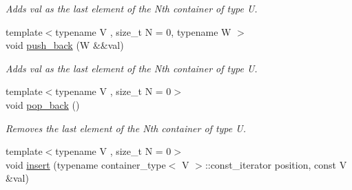 \begin{DoxyCompactItemize}
\begin{DoxyCompactList}\small\item\em Adds val as the last element of the Nth container of type U. \end{DoxyCompactList}\item 
\hypertarget{classheterogeneous_1_1heterovector_3_01_t_00_01_u_00_01_types_8_8_8_4_a72d88bf82827d76a5abdf41ce1f39446}{}{\footnotesize template$<$typename V , size\+\_\+t N = 0, typename W $>$ }\\void \hyperlink{classheterogeneous_1_1heterovector_3_01_t_00_01_u_00_01_types_8_8_8_4_a72d88bf82827d76a5abdf41ce1f39446}{push\+\_\+back} (W \&\&val)\label{classheterogeneous_1_1heterovector_3_01_t_00_01_u_00_01_types_8_8_8_4_a72d88bf82827d76a5abdf41ce1f39446}

\begin{DoxyCompactList}\small\item\em Adds val as the last element of the Nth container of type U. \end{DoxyCompactList}\item 
\hypertarget{classheterogeneous_1_1heterovector_3_01_t_00_01_u_00_01_types_8_8_8_4_aa2b951d6cefc5be09cbf61a4ae15fa63}{}{\footnotesize template$<$typename V , size\+\_\+t N = 0$>$ }\\void \hyperlink{classheterogeneous_1_1heterovector_3_01_t_00_01_u_00_01_types_8_8_8_4_aa2b951d6cefc5be09cbf61a4ae15fa63}{pop\+\_\+back} ()\label{classheterogeneous_1_1heterovector_3_01_t_00_01_u_00_01_types_8_8_8_4_aa2b951d6cefc5be09cbf61a4ae15fa63}

\begin{DoxyCompactList}\small\item\em Removes the last element of the Nth container of type U. \end{DoxyCompactList}\item 
\hypertarget{classheterogeneous_1_1heterovector_3_01_t_00_01_u_00_01_types_8_8_8_4_abd4d41dcf4cb64d37ee8d2ef11008f29}{}{\footnotesize template$<$typename V , size\+\_\+t N = 0$>$ }\\void \hyperlink{classheterogeneous_1_1heterovector_3_01_t_00_01_u_00_01_types_8_8_8_4_abd4d41dcf4cb64d37ee8d2ef11008f29}{insert} (typename container\+\_\+type$<$ V $>$\+::const\+\_\+iterator position, const V \&val)\label{classheterogeneous_1_1heterovector_3_01_t_00_01_u_00_01_types_8_8_8_4_abd4d41dcf4cb64d37ee8d2ef11008f29}


\end{DoxyCompactItemize}
